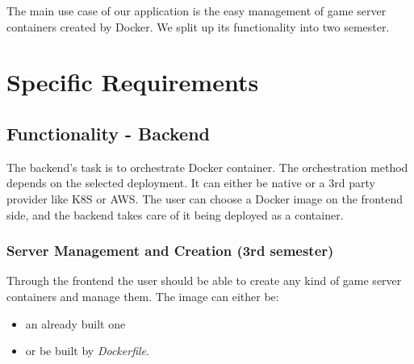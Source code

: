 \documentclass[a4paper,12pt,chapterprefix=false,bibliography=totoc,listof=totoc,]{scrreprt}
\newcommand{\gls}[1]{\uppercase{#1}}
\begin{document}
The main use case of our application is the easy management of game server containers created by Docker. We split up its functionality into two semester.

\chapter{Specific Requirements}

\section{Functionality - Backend}


The backend's task is to orchestrate Docker container. The orchestration method depends on the selected deployment. It can either be native or a 3rd party provider like \gls{k8s} or \gls{aws}. The user can choose a Docker image on the frontend side, and the backend takes care of it being deployed as a container.

\subsection{Server Management and Creation (3rd semester)}
Through the frontend the user should be able to create any kind of game server containers and manage them. The image can either be:
\begin{itemize}
	\item an already built one 
	\item or be built by \emph{Dockerfile}.
\end{itemize}
 
\end{document}
